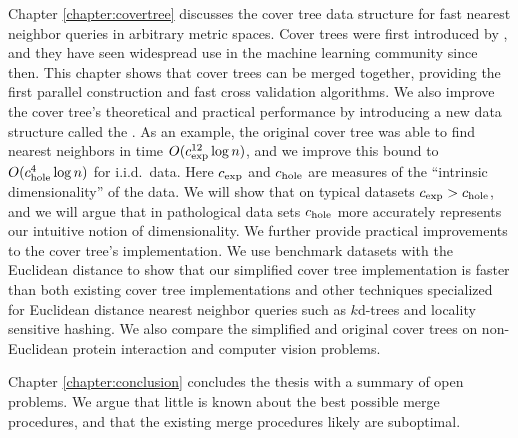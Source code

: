 \documentclass[thesis.tex]{subfiles}
\begin{document}
Chapter \ref{chapter:covertree} discusses the cover tree data structure for fast nearest neighbor queries in arbitrary metric spaces.
Cover trees were first introduced by \cite{beygelzimer2006cover},
and they have seen widespread use in the machine learning community since then.
This chapter shows that cover trees can be merged together,
providing the first parallel construction and fast cross validation algorithms.
We also improve the cover tree's theoretical and practical performance by introducing a new data structure called the .
As an example, 
the original cover tree was able to find nearest neighbors in time $O(c_\textnormal{exp}^{12}\log n)$,
and we improve this bound to $O(c_\textnormal{hole}^4\log n)$ for i.i.d.\ data.
Here $c_\textnormal{exp}$ and $c_\textnormal{hole}$ are measures of the ``intrinsic dimensionality'' of the data.
We will show that on typical datasets $c_\textnormal{exp} > c_\textnormal{hole}$,
and we will argue that in pathological data sets $c_\textnormal{hole}$ more accurately represents our intuitive notion of dimensionality.
We further provide practical improvements to the cover tree's implementation.
We use benchmark datasets with the Euclidean distance to show that our simplified cover tree implementation is faster than both existing cover tree implementations and other techniques specialized for Euclidean distance nearest neighbor queries such as $k$d-trees and locality sensitive hashing.
We also compare the simplified and original cover trees on non-Euclidean protein interaction and computer vision problems.

Chapter \ref{chapter:conclusion} concludes the thesis with a summary of open problems.
We argue that little is known about the best possible merge procedures,
and that the existing merge procedures likely are suboptimal.

\end{document}
